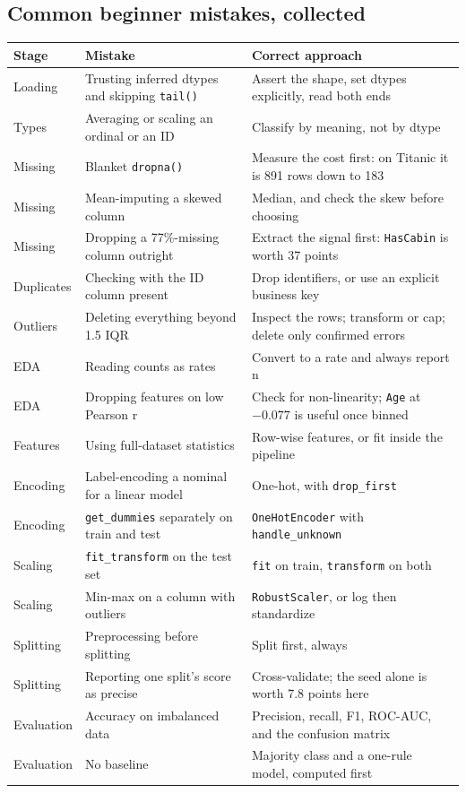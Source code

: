 \documentclass[11pt,a4paper]{article}
\begin{document}
\subsection{Common beginner mistakes, collected}

\begin{tabularx}{\textwidth}{@{}l X X@{}}
\toprule
\rowcolor{tablehead} \textbf{Stage} & \textbf{Mistake} & \textbf{Correct approach} \\
\midrule
Loading & Trusting inferred dtypes and skipping \lstinline|tail()| & Assert the shape, set dtypes explicitly, read both ends \\
Types & Averaging or scaling an ordinal or an ID & Classify by meaning, not by dtype \\
Missing & Blanket \lstinline|dropna()| & Measure the cost first: on Titanic it is 891 rows down to 183 \\
Missing & Mean-imputing a skewed column & Median, and check the skew before choosing \\
Missing & Dropping a 77\%-missing column outright & Extract the signal first: \texttt{HasCabin} is worth 37 points \\
Duplicates & Checking with the ID column present & Drop identifiers, or use an explicit business key \\
Outliers & Deleting everything beyond 1.5 IQR & Inspect the rows; transform or cap; delete only confirmed errors \\
EDA & Reading counts as rates & Convert to a rate and always report n \\
EDA & Dropping features on low Pearson r & Check for non-linearity; \texttt{Age} at $-0.077$ is useful once binned \\
Features & Using full-dataset statistics & Row-wise features, or fit inside the pipeline \\
Encoding & Label-encoding a nominal for a linear model & One-hot, with \lstinline|drop_first| \\
Encoding & \lstinline|get_dummies| separately on train and test & \lstinline|OneHotEncoder| with \lstinline|handle_unknown| \\
Scaling & \lstinline|fit_transform| on the test set & \lstinline|fit| on train, \lstinline|transform| on both \\
Scaling & Min-max on a column with outliers & \lstinline|RobustScaler|, or log then standardize \\
Splitting & Preprocessing before splitting & Split first, always \\
Splitting & Reporting one split's score as precise & Cross-validate; the seed alone is worth 7.8 points here \\
Evaluation & Accuracy on imbalanced data & Precision, recall, F1, ROC-AUC, and the confusion matrix \\
Evaluation & No baseline & Majority class and a one-rule model, computed first \\
\bottomrule
\end{tabularx}
\end{document}
